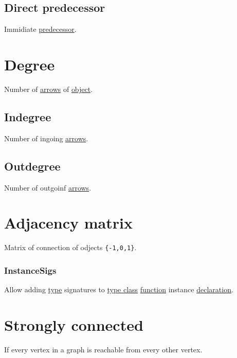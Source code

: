 \documentclass[a4paper,14pt,oneside]{book}
\begin{document}
\subsection{\label{org1f908a6}Direct predecessor}
\label{sec:orge268767}
Immidiate \hyperref[org2f4e94a]{predecessor}.\\


\section{\label{org292a5ac}Degree}
\label{sec:orgc44b0af}
Number of \hyperref[org94bcc2e]{arrows} of \hyperref[org920c789]{object}.\\

\subsection{\label{org988d58b}Indegree}
\label{sec:orgcbe525a}
Number of ingoing \hyperref[org94bcc2e]{arrows}.\\

\subsection{\label{orgac7ad88}Outdegree}
\label{sec:orge1d85c9}
Number of outgoinf \hyperref[org94bcc2e]{arrows}.\\

\section{\label{orgbbf2b2b}Adjacency matrix}
\label{sec:orgdd80cbe}
Matrix of connection of odjects \texttt{\{-1,0,1\}}.\\

\subsubsection{\label{org4723233}InstanceSigs}
\label{sec:org7888693}
Allow adding \hyperref[orgdbcea73]{type} signatures to \hyperref[org8e22081]{type class} \hyperref[org39271b2]{function} instance \hyperref[org1113171]{declaration}.\\


\section{\label{orgb8989f4}Strongly connected}
\label{sec:org8f6223f}
If every vertex in a graph is reachable from every other vertex.\\
\end{document}
